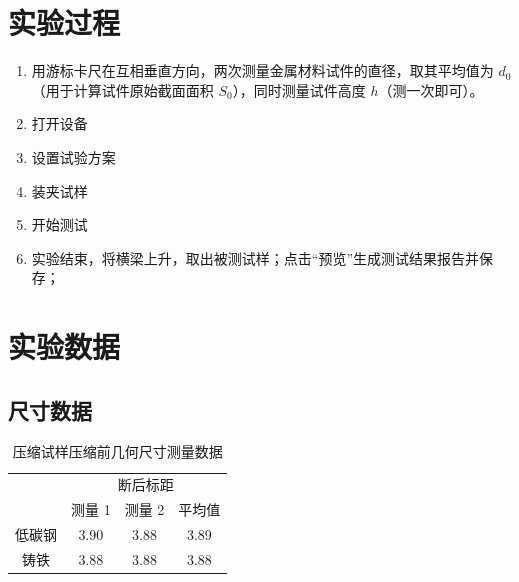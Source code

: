 \section{实验过程}%
    \begin{enumerate}
        \item 用游标卡尺在互相垂直方向，两次测量金属材料试件的直径，取其平均值为 $d_0$（用于计算试件原始截面面积 $S_0$），同时测量试件高度 $h$（测一次即可）。
        \item 打开设备
        \item 设置试验方案
        \item 装夹试样
        \item 开始测试
        \item 实验结束，将横梁上升，取出被测试样；点击“预览”生成测试结果报告并保存；
    \end{enumerate}
\newpage
\section{实验数据}
    \subsection{尺寸数据}
    \begin{table}[!ht]
        \caption{压缩试样压缩前几何尺寸测量数据}
        \begin{tabular}{*{4}{c}}\toprule
            & \multicolumn{3}{c}{断后标距}\\
            & 测量 1 & 测量 2 & 平均值 \\ \midrule
            低碳钢 & 3.90 & 3.88 & 3.89 \\ 
            铸铁 & 3.88 & 3.88 & 3.88 \\ \bottomrule
        \end{tabular}
    \end{table}
